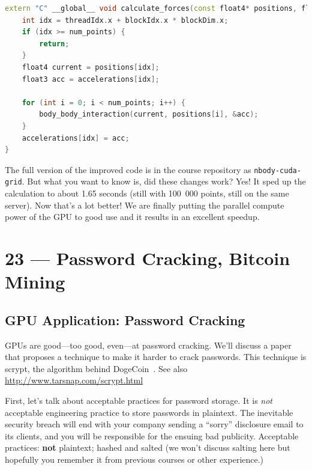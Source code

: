 \documentclass[a4paper]{report}
\begin{document}
\begin{lstlisting}[language=C++]
extern "C" __global__ void calculate_forces(const float4* positions, float3* accelerations, int num_points) {
    int idx = threadIdx.x + blockIdx.x * blockDim.x;
    if (idx >= num_points) {
        return;
    }
    float4 current = positions[idx];
    float3 acc = accelerations[idx];

    for (int i = 0; i < num_points; i++) {
        body_body_interaction(current, positions[i], &acc);
    }
    accelerations[idx] = acc;
}
\end{lstlisting}

The full version of the improved code is in the course repository as \texttt{nbody-cuda-grid}. But what you want to know is, did these changes work? Yes! It sped up the calculation to about 1.65 seconds (still with 100~000 points, still on the same server). Now that's a lot better! We are finally putting the parallel compute power of the GPU to good use and it results in an excellent speedup.









\chapter*{23 --- Password Cracking, Bitcoin Mining}


\section*{GPU Application: Password Cracking}

GPUs are good---too good, even---at password cracking. We'll discuss a paper
that proposes a technique to make it harder to crack passwords. This technique
is scrypt, the algorithm behind DogeCoin~\cite{scrypt}. See also \url{http://www.tarsnap.com/scrypt.html}

First, let's talk about acceptable practices for password storage. It is \emph{not}
acceptable engineering practice to store passwords in plaintext. The inevitable security
breach will end with your company sending a ``sorry'' disclosure email to its clients,
and you will be responsible for the ensuing bad publicity. Acceptable practices: {\bf not} plaintext; hashed and salted (we won't discuss salting here but hopefully you remember it from previous courses or other experience.)
\end{document}
